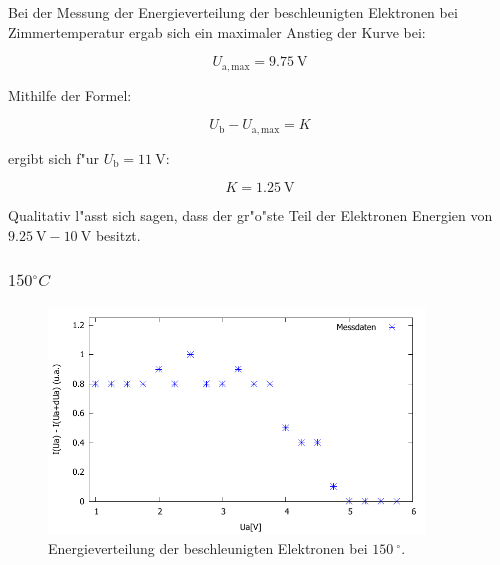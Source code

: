 Bei der Messung der Energieverteilung der beschleunigten Elektronen bei Zimmertemperatur ergab sich ein maximaler Anstieg der Kurve bei:

\begin{equation}
	U_\mathrm{a,max} = \SI{9.75}{\volt}
\end{equation}

Mithilfe der Formel:

\begin{equation}
	U_\mathrm{b} - U_\mathrm{a,max} = K
\end{equation}

ergibt sich f"ur $U_\mathrm{b} = \SI{11}{\volt}$:

\begin{equation}
	K = \SI{1.25}{\volt}
\end{equation}

Qualitativ l"asst sich sagen, dass der gr"o"ste Teil der Elektronen Energien von $\SI{9.25}{\volt} - \SI{10}{\volt}$ besitzt.

\subsubsection{$\si{150}{^\circ C}$} %
\label{sub:_si}



\begin{figure}[!h]
	\centering
	\includegraphics[width = 10cm]{img/t150.pdf}
	\caption{Energieverteilung der beschleunigten Elektronen bei $\SI{150}{^\circ}$.}
	\label{gra}
\end{figure}
